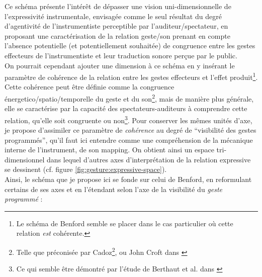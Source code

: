 \noindent Ce schéma présente l'intérêt de dépasser une vision uni-dimensionnelle de l'expressivité instrumentale, envisagée comme le seul résultat du degré d'agentivité de l'instrumentiste perceptible par l'auditeur/spectateur, en proposant une caractérisation de la relation geste/son prenant en compte l'absence potentielle (et potentiellement souhaitée) de congruence entre les gestes effecteurs de l'instrumentiste et leur traduction sonore perçue par le public.\\
\indent On pourrait cependant ajouter une dimension à ce schéma en y insérant le paramètre de cohérence de la relation entre les gestes effecteurs et l'effet produit\footnote{Le schéma de Benford semble se placer dans le cas particulier où cette relation \textit{est} cohérente.}. Cette cohérence peut être définie comme la congruence énergetico/spatio/temporelle du geste et du son\footnote{Telle que préconisée par Cadoz\footnote{Cf. supra p. \pageref{sec:gesture:ergotic}.}, ou John Croft dans \cite{croft_theses_2007}}, mais de manière plus générale, elle se caractérise par la capacité des spectateurs-auditeurs à comprendre cette relation, qu'elle soit congruente ou non\footnote{Ce qui semble être démontré par l'étude de Berthaut et al. dans \cite{berthaut_rouages:_2013}}. Pour conserver les mêmes unités d'axe, je propose d'assimiler ce paramètre de \textit{cohérence} au degré de ``visibilité des gestes programmés'', qu'il faut ici entendre comme une compréhension de la mécanique interne de l'instrument, de son mapping. On obtient ainsi un espace tri-dimensionnel dans lequel d'autres axes d'interprétation de la relation expressive se dessinent (cf. figure \ref{fig:gesture:expressive-space}).\\
\noindent Ainsi, le schéma que je propose ici se fonde sur celui de Benford, en reformulant certains de ses axes et en l'étendant selon l'axe de la visibilité du \textit{geste programmé} :
\vspace{-1em}
